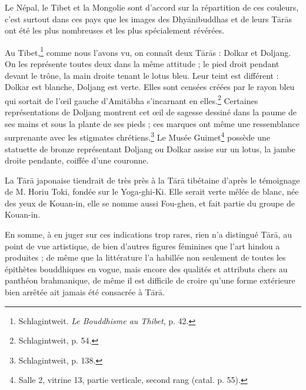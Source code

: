 \documentclass[a4paper, 11pt, oneside, french]{article}
\begin{document}
Le Népal, le Tibet et la Mongolie sont d'accord sur la répartition de ces couleurs, c'est surtout dans ces pays que les images des Dhy\={a}nibuddhas et de leurs T\={a}r\={a}s ont été les plus nombreuses et les plus spécialement révérées.

Au Tibet,\footnote{Schlagintweit. \emph{Le Bouddhisme au Thibet}, p. 42.} comme nous l'avons vu, on connaît deux T\={a}r\={a}s : Dolkar et Doljang. On les représente toutes deux dans la même attitude ; le pied droit pendant devant le trône, la main droite tenant le lotus bleu. Leur teint est différent : Dolkar est blanche, Doljang est verte. Elles sont censées créées par le rayon bleu qui sortait de l'œil gauche d'Amit\={a}bha s'incarnant en elles.\footnote{Schlagintweit, p. 54.} Certaines représentations de Doljang montrent cet œil de sagesse dessiné dans la paume de ses mains et sous la plante de ses pieds ; ces marques ont même une ressemblance surprenante avec les stigmates chrétiens.\footnote{Schlagintweit, p. 138.} Le Musée Guimet\footnote{Salle 2, vitrine 13, partie verticale, second rang (catal. p. 55).} possède une statuette de bronze représentant Doljang ou Dolkar assise sur un lotus, la jambe droite pendante, coiffée d'une couronne.

La T\={a}r\={a} japonaise tiendrait de très près à la T\={a}r\={a} tibétaine d'après le témoignage de M. Horiu Toki, fondée sur le Yoga-ghi-Ki. Elle serait verte mêlée de blanc, née des yeux de Kouan-in, elle se nomme aussi Fou-ghen, et fait partie du groupe de Kouan-in.

En somme, à en juger sur ces indications trop rares, rien n'a distingué T\={a}r\={a}, au point de vue artistique, de bien d'autres figures féminines que l'art hindou a produites ; de même que la littérature l'a habillée non seulement de toutes les épithètes bouddhiques en vogue, mais encore des qualités et attributs chers au panthéon brahmanique, de même il est difficile de croire qu'une forme extérieure bien arrêtée ait jamais été consacrée à T\={a}r\={a}.
\end{document}
